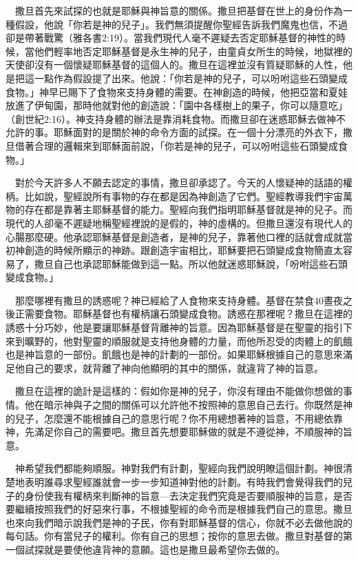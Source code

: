 \documentclass{book}
\begin{document}
　撒旦首先來試探的也就是耶穌與神旨意的關係。撒旦把基督在世上的身份作為一種假設，他說「你若是神的兒子」。我們無須提醒你聖經告訴我們魔鬼也信，不過卻是帶著戰驚（雅各書2:19）。當我們現代人毫不遲疑去否定耶穌基督的神性的時候，當他們輕率地否定耶穌基督是永生神的兒子，由童貞女所生的時候，地獄裡的天使卻沒有一個懷疑耶穌基督的這個人的。撒旦在這裡並沒有質疑耶穌的人性，他是把這一點作為假設提了出來。他說：「你若是神的兒子，可以吩咐這些石頭變成食物。」神早已賜下了食物來支持身體的需要。在神創造的時候，他把亞當和夏娃放進了伊甸園，那時他就對他的創造說：「園中各樣樹上的果子，你可以隨意吃」（創世紀2:16）。神支持身體的辦法是靠消耗食物。而撒旦卻在迷惑耶穌去做神不允許的事。耶穌面對的是關於神的命令方面的試探。在一個十分漂亮的外衣下，撒旦借著合理的邏輯來到耶穌面前說，「你若是神的兒子，可以吩咐這些石頭變成食物。」

　對於今天許多人不願去認定的事情，撒旦卻承認了。今天的人懷疑神的話語的權柄。比如說，聖經說所有事物的存在都是因為神創造了它們。聖經教導我們宇宙萬物的存在都是靠著主耶穌基督的能力。聖經向我們指明耶穌基督就是神的兒子。而現代的人卻毫不遲疑地稱聖經裡說的是假的，神的虛構的。但撒旦還沒有現代人的心腸那麼硬。他承認耶穌基督是創造者，是神的兒子，靠著他口裡的話就會成就當初神創造的時候所顯示的神跡。跟創造宇宙相比，耶穌要把石頭變成食物簡直太容易了，撒旦自己也承認耶穌能做到這一點。所以他就迷惑耶穌說，「吩咐這些石頭變成食物。」

　那麼哪裡有撒旦的誘惑呢？神已經給了人食物來支持身體。基督在禁食40晝夜之後正需要食物。耶穌基督也有權柄讓石頭變成食物。誘惑在那裡呢？撒旦在這裡的誘惑十分巧妙，他是要讓耶穌基督背離神的旨意。因為耶穌基督是在聖靈的指引下來到曠野的，他對聖靈的順服就是支持他身體的力量，而他所忍受的肉體上的飢餓也是神旨意的一部份。飢餓也是神的計劃的一部份。如果耶穌根據自己的意思來滿足他自己的要求，就背離了神向他顯明的其中的關係，就違背了神的旨意。

　撒旦在這裡的詭計是這樣的：假如你是神的兒子，你沒有理由不能做你想做的事情。他在暗示神與子之間的關係可以允許他不按照神的意思自己去行。你既然是神的兒子，怎麼還不能根據自己的意思行呢？你不用總想著神的旨意，不用總依靠神，先滿足你自己的需要吧。撒旦首先想要耶穌做的就是不遵從神，不順服神的旨意。

　神希望我們都能夠順服。神對我們有計劃，聖經向我們說明瞭這個計劃。神很清楚地表明誰尋求聖經誰就會一步一步知道神對他的計劃。有時我們會覺得我們的兒子的身份使我有權柄來判斷神的旨意---去決定我們究竟是否要順服神的旨意，是否要繼續按照我們的好惡來行事，不根據聖經的命令而是根據我們自己的意思。撒旦也來向我們暗示說我們是神的子民，你有對耶穌基督的信心，你就不必去做他說的每句話。你有當兒子的權利。你有自己的思想；按你的意思去做。撒旦對基督的第一個試探就是要使他違背神的意願。這也是撒旦最希望你去做的。
\end{document}
